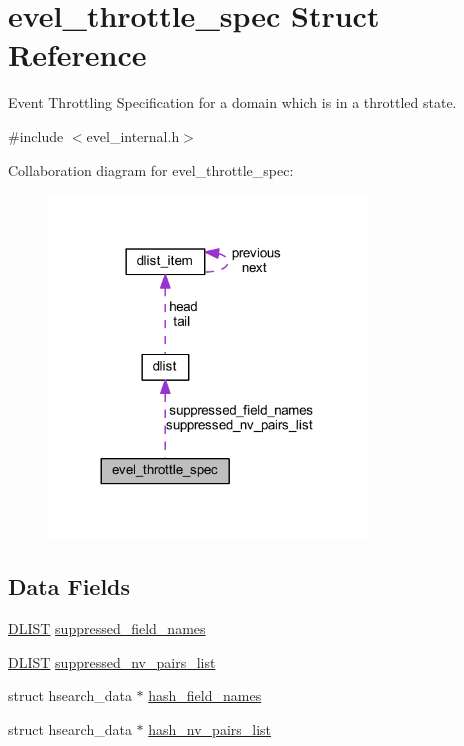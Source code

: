 \hypertarget{structevel__throttle__spec}{}\section{evel\+\_\+throttle\+\_\+spec Struct Reference}
\label{structevel__throttle__spec}


Event Throttling Specification for a domain which is in a throttled state.  




{\ttfamily \#include $<$evel\+\_\+internal.\+h$>$}



Collaboration diagram for evel\+\_\+throttle\+\_\+spec\+:
\nopagebreak
\begin{figure}[H]
\begin{center}
\leavevmode
\includegraphics[width=240pt]{structevel__throttle__spec__coll__graph}
\end{center}
\end{figure}
\subsection*{Data Fields}
\begin{DoxyCompactItemize}
\item 
\hyperlink{double__list_8h_a45f4a129042d9e1aa4ffd31fe13e4d14}{D\+L\+I\+ST} \hyperlink{structevel__throttle__spec_a31b2a68aa43a1cb9f6e74570f2bcfb1b}{suppressed\+\_\+field\+\_\+names}
\item 
\hyperlink{double__list_8h_a45f4a129042d9e1aa4ffd31fe13e4d14}{D\+L\+I\+ST} \hyperlink{structevel__throttle__spec_ad99ddec35b92f7b32be0803de60df940}{suppressed\+\_\+nv\+\_\+pairs\+\_\+list}
\item 
struct hsearch\+\_\+data $\ast$ \hyperlink{structevel__throttle__spec_a9d52da1ea954b560729797975c2a0216}{hash\+\_\+field\+\_\+names}
\item 
struct hsearch\+\_\+data $\ast$ \hyperlink{structevel__throttle__spec_a2abbbfc9889e07e4a5aeaf8a8ec6f2ae}{hash\+\_\+nv\+\_\+pairs\+\_\+list}
\end{DoxyCompactItemize}


